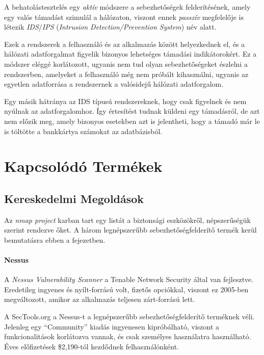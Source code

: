 	A behatolástesztelés egy \textit{aktív} módszere a sebezhetőségek felderítésének, amely egy valós támadást szimulál a hálózaton, viszont ennek \textit{passzív} megfelelője is létezik \textit{IDS}/\textit{IPS} (\textit{Intrusion Detection/Prevention System}) név alatt.
	
	Ezek a rendszerek a felhasználó és az alkalmazás között helyezkednek el, és a hálózati adatforgalmat figyelik bizonyos lehetséges támadási indikátorokért. Ez a módszer eléggé korlátozott, ugyanis nem tud olyan sebezhetőségeket észlelni a rendszerben, amelyeket a felhasználó még nem próbált kihasználni, ugyanis az egyetlen adatforrása a rendszernek a valósidejű hálózati adatforgalom.
	
	Egy másik hátránya az IDS típusú rendszereknek, hogy csak figyelnek és nem nyúlnak az adatforgalomhoz. Így értesítést tudnak küldeni egy támadásról, de azt nem előzik meg, amely bizonyos esetekben azt is jelentheti, hogy a támadó már le is töltötte a bankkártya számokat az adatbázisból.

\section*{Kapcsolódó Termékek} \label{relwork}
	
\subsection*{Kereskedelmi Megoldások} \label{ssec:comtools}
	
	Az \textit{nmap project} karban tart egy listát a biztonsági eszközökről, népszerűségük szerint rendezve őket\cite{sectools}. A három legnépszerűbb sebezhetőségfelderítő termék kerül bemutatásra ebben a fejezetben.
	
	\paragraph*{Nessus} A \textit{Nessus Vulnerability Scanner}\cite{nessus} a Tenable Network Security által van fejlesztve. Eredetileg ingyenes és nyílt-forrású volt, fizetős opciókkal, viszont ez 2005-ben megváltozott, amikor az alkalmazás teljesen zárt-forrású lett.
	
	A SecTools.org a Nessus-t a legnépszerűbb sebezhetőségfelderítő terméknek véli. Jelenleg egy ``Community'' kiadás ingyenesen kipróbálható, viszont a funkcionalitások korlátozva vannak, és csak személyes használatra használható. Éves előfizetések \$2,190-tól kezdődnek felhasználónként.
	
